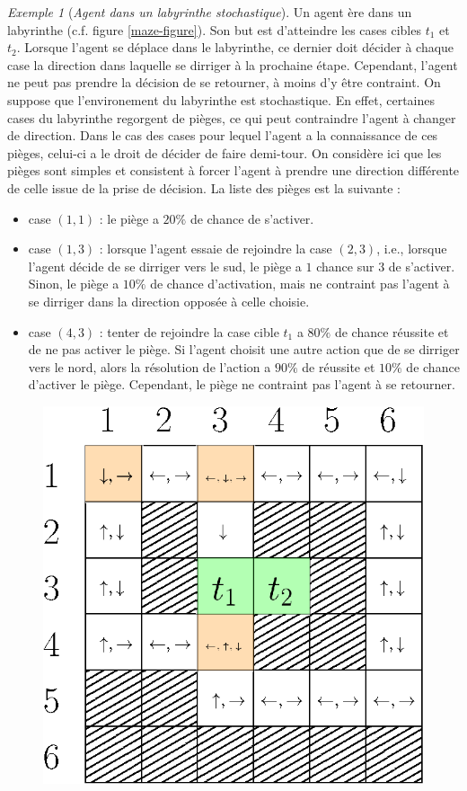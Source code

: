 \documentclass[12pt,a4paper]{report}
\theoremstyle{definition}%
\theoremstyle{remark}
\newtheorem{example}{Exemple}[chapter]
\let\labelitemi\labelitemii
\begin{document}
\begin{example}[\textit{Agent dans un labyrinthe stochastique}] \label{maze-agent}
Un agent ère dans un labyrinthe (c.f. figure \ref{maze-figure}). Son but est d'atteindre les cases cibles
$t_1$ et $t_2$. Lorsque l'agent se déplace
dans le labyrinthe, ce dernier doit décider à chaque case la
direction dans laquelle se dirriger à la prochaine étape. Cependant, l'agent
ne peut pas prendre la décision de se retourner, à moins d'y être contraint.
On suppose que l'environement
du labyrinthe est stochastique. En effet, certaines cases du
labyrinthe regorgent de pièges, ce qui peut contraindre l'agent à changer de
direction. Dans le cas des cases pour lequel l'agent a la connaissance de ces
pièges, celui-ci a le droit de décider de faire demi-tour.
On considère ici que les pièges sont simples et consistent à forcer l'agent à
prendre une direction différente de celle issue de la prise de décision.
La liste des pièges est la suivante :
\begin{itemize}
	\renewcommand{\labelitemi}{\tiny$\bullet$}
	\item case $(1, 1)$ : le piège a $20 \%$ de chance de s'activer.
	\item case $(1, 3)$ : lorsque l'agent essaie de rejoindre la case $(2, 3)$,
		i.e., lorsque l'agent décide de se dirriger vers le sud, le piège a
		$1$ chance sur $3$ de s'activer. Sinon, le piège a $10 \%$ de chance
		d'activation, mais ne contraint pas l'agent à se dirriger dans la direction
		opposée à celle choisie.
	\item case $(4, 3)$ : tenter de rejoindre la case cible $t_1$ a $80 \%$ de
		chance réussite et de ne pas activer le piège. Si l'agent choisit une autre
		action que de se dirriger vers le nord, alors la résolution de l'action a $90 \%$ de
		réussite et $10 \%$ de chance d'activer le piège. Cependant, le piège ne
		contraint pas l'agent à se retourner.
\end{itemize}
	\begin{figure}[H]
		\centering
		\captionsetup{justification=centering}
		\includegraphics[scale=0.8]{figures/maze}

\end{figure}
\end{example}
\end{document}
